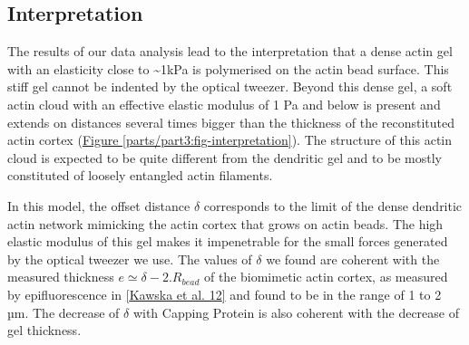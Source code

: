 \documentclass[A4paperpaper,11pt,english]{sphinxmanual}
\begin{document}
\subsection{Interpretation}
\label{parts/part3:interpretation}
The results of our data analysis lead to the interpretation that
a dense actin gel with an elasticity close to \textasciitilde{}1kPa is polymerised
on the actin bead surface. This stiff gel
cannot be indented by the optical tweezer. Beyond this dense gel, a soft
actin cloud with an effective elastic modulus of 1 Pa and below is
present and extends on distances several times bigger than the thickness
of the reconstituted actin cortex (\hyperref[parts/part3:fig-interpretation]{Figure  \ref*{parts/part3:fig-interpretation}}). The
structure of this actin cloud is expected to be quite different from the
dendritic gel and to be mostly constituted of loosely entangled actin filaments.

In this model, the offset distance \(\delta\) corresponds to the limit of the dense
dendritic actin network mimicking the actin cortex that grows on actin beads.
The high elastic modulus of this gel makes it impenetrable for the small forces generated by the optical tweezer we use. The
values of \(\delta\) we found are coherent with the measured thickness \(e
\simeq \delta - 2.R_{bead}\) of the  biomimetic actin cortex, as measured by
epifluorescence in {\hyperref[parts/part3:kawska2012]{{[}Kawska et al. 12{]}}} and found to be in the range of 1 to 2 µm. The decrease
of \(\delta\) with Capping Protein is also coherent with the decrease of gel
thickness.
\end{document}
